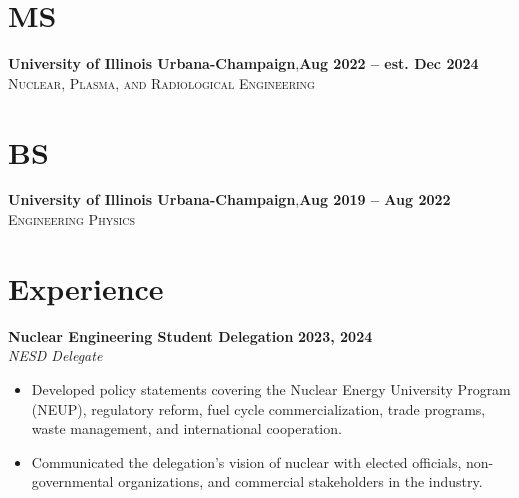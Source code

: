 \documentclass[margin,line]{resume}
\begin{document}
\begin{resume}
    \section{\mysidestyle MS}
    \textbf{University of Illinois Urbana-Champaign},\hfill\textbf{Aug 2022 -- est. Dec 2024}\\
    \textsc{Nuclear, Plasma, and Radiological Engineering}\\
    \vspace{-5.5mm}
    \section{\mysidestyle BS}
    \textbf{University of Illinois Urbana-Champaign},\hfill\textbf{Aug 2019 -- Aug 2022}\\%
    \textsc{Engineering Physics}\\
    \vspace{-5mm}

    \section{\mysidestyle Experience}
    \textbf{Nuclear Engineering Student Delegation} \hfill \textbf{2023, 2024} \\
    \textsl{NESD Delegate} \\
    \begin{itemize}
        \item Developed policy statements covering the Nuclear Energy University Program (NEUP), regulatory reform, fuel cycle commercialization, trade programs, waste management, and international cooperation.
        \item Communicated the delegation's vision of nuclear with elected officials, non-governmental organizations, and commercial stakeholders in the industry.
    \end{itemize}


\end{resume}
\end{document}
